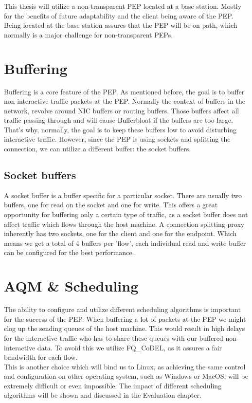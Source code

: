 \documentclass[a4paper,english, 11pt]{report}
\begin{document}
This thesis will utilize a non-transparent PEP located at a base station. Mostly for the benefits of future adaptability and the client being aware of the PEP. Being located at the base station assures that the PEP will be on path, which normally is a major challenge for non-transparent PEPs.

\section{Buffering}
Buffering is a core feature of the PEP. As mentioned before, the goal is to buffer non-interactive traffic packets at the PEP. Normally the context of buffers in the network, revolve around NIC buffers or routing buffers. Those buffers affect all traffic passing through and will cause Bufferbloat if the buffers are too large. That's why, normally, the goal is to keep these buffers low to avoid disturbing interactive traffic. However, since the PEP is using sockets and splitting the connection, we can utilize a different buffer: the socket buffers.

\subsection{Socket buffers}
A socket buffer is a buffer specific for a particular socket. There are usually two buffers, one for read on the socket and one for write. This offers a great opportunity for buffering only a certain type of traffic, as a socket buffer does not affect traffic which flows through the host machine. A connection splitting proxy inherently has two sockets, one for the client and one for the endpoint. Which means we get a total of 4 buffers per 'flow', each individual read and write buffer can be configured for the best performance.

\section{AQM \& Scheduling}
The ability to configure and utilize different scheduling algorithms is important for the success of the  PEP. When buffering a lot of packets at the PEP we might clog up the sending queues of the host machine. This would result in high delays for the interactive traffic who has to share these queues with our buffered non-interactive data. To avoid this we utilize FQ\_CoDEL, as it assures a fair bandwidth for each flow.\\

This is another choice which will bind us to Linux, as achieving the same control and configuration on other operating system, such as Windows or MacOS, will be extremely difficult or even impossible. The impact of different scheduling algorithms will be shown and discussed in the Evaluation chapter.
\end{document}
